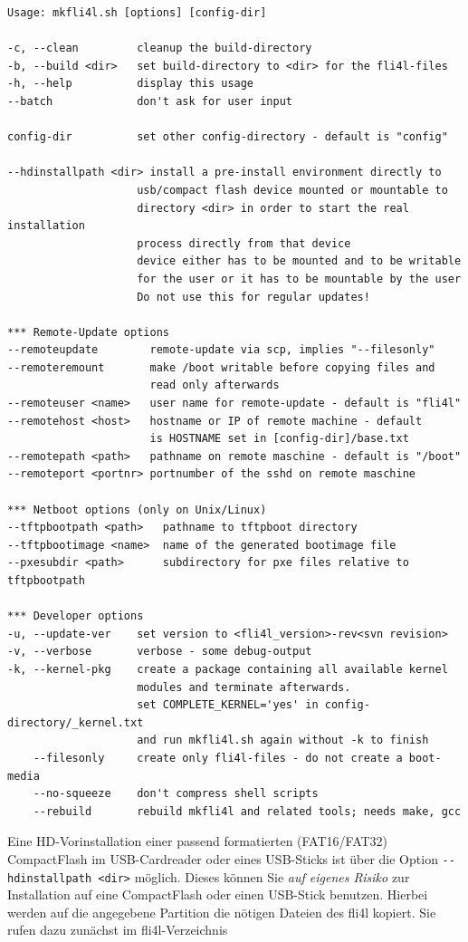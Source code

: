   \begin{verbatim}
Usage: mkfli4l.sh [options] [config-dir]

-c, --clean         cleanup the build-directory
-b, --build <dir>   set build-directory to <dir> for the fli4l-files
-h, --help          display this usage
--batch             don't ask for user input

config-dir          set other config-directory - default is "config"

--hdinstallpath <dir> install a pre-install environment directly to
                    usb/compact flash device mounted or mountable to
                    directory <dir> in order to start the real installation
                    process directly from that device
                    device either has to be mounted and to be writable
                    for the user or it has to be mountable by the user
                    Do not use this for regular updates!

*** Remote-Update options
--remoteupdate        remote-update via scp, implies "--filesonly"
--remoteremount       make /boot writable before copying files and
                      read only afterwards
--remoteuser <name>   user name for remote-update - default is "fli4l"
--remotehost <host>   hostname or IP of remote machine - default
                      is HOSTNAME set in [config-dir]/base.txt
--remotepath <path>   pathname on remote maschine - default is "/boot"
--remoteport <portnr> portnumber of the sshd on remote maschine

*** Netboot options (only on Unix/Linux)
--tftpbootpath <path>   pathname to tftpboot directory
--tftpbootimage <name>  name of the generated bootimage file
--pxesubdir <path>      subdirectory for pxe files relative to tftpbootpath

*** Developer options
-u, --update-ver    set version to <fli4l_version>-rev<svn revision>
-v, --verbose       verbose - some debug-output
-k, --kernel-pkg    create a package containing all available kernel
                    modules and terminate afterwards.
                    set COMPLETE_KERNEL='yes' in config-directory/_kernel.txt
                    and run mkfli4l.sh again without -k to finish
    --filesonly     create only fli4l-files - do not create a boot-media
    --no-squeeze    don't compress shell scripts
    --rebuild       rebuild mkfli4l and related tools; needs make, gcc

  \end{verbatim}

   Eine HD-Vorinstallation einer passend formatierten (FAT16/FAT32) CompactFlash im
   USB-Cardreader oder eines USB-Sticks ist über die Option \verb+--hdinstallpath <dir>+ möglich.
   Dieses können Sie \emph{auf eigenes Risiko} zur Installation auf eine CompactFlash oder
   einen USB-Stick benutzen.
   Hierbei werden auf die angegebene Partition die nötigen Dateien des fli4l kopiert.
   Sie rufen dazu zunächst im fli4l-Verzeichnis

